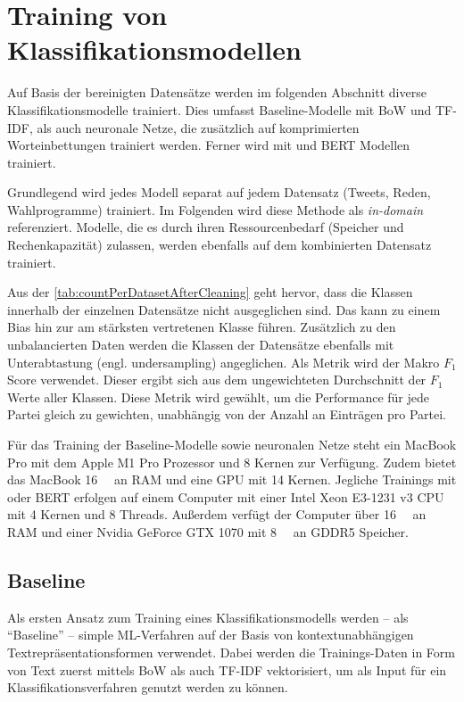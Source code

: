
\chapter{Training von Klassifikationsmodellen} \label{ch:crispDm_2}

Auf Basis der bereinigten Datensätze werden im folgenden Abschnitt diverse Klassifikationsmodelle trainiert. Dies umfasst Baseline-Modelle mit \ac{BoW} und \ac{TF-IDF}, als auch neuronale Netze, die zusätzlich auf komprimierten Worteinbettungen trainiert werden. Ferner wird mit \ft und \ac{BERT} Modellen trainiert.

Grundlegend wird jedes Modell separat auf jedem Datensatz (Tweets, Reden, Wahlprogramme) trainiert. Im Folgenden wird diese Methode als \textit{in-domain} referenziert. Modelle, die es durch ihren Ressourcenbedarf (Speicher und Rechenkapazität) zulassen, werden ebenfalls auf dem kombinierten Datensatz trainiert. 

Aus der \autoref{tab:countPerDatasetAfterCleaning} geht hervor, dass die Klassen innerhalb der einzelnen Datensätze nicht ausgeglichen sind. Das kann zu einem Bias hin zur am stärksten vertretenen Klasse führen. Zusätzlich zu den unbalancierten Daten werden die Klassen der Datensätze ebenfalls mit Unterabtastung (engl. undersampling) angeglichen. Als Metrik wird der Makro \(F_1\) Score verwendet. Dieser ergibt sich aus dem ungewichteten Durchschnitt der \(F_1\) Werte aller Klassen. Diese Metrik wird gewählt, um die Performance für jede Partei gleich zu gewichten, unabhängig von der Anzahl an Einträgen pro Partei.

Für das Training der Baseline-Modelle sowie neuronalen Netze steht ein MacBook Pro mit dem Apple M1 Pro Prozessor und \num{8} Kernen zur Verfügung. Zudem bietet das MacBook \SI{16}{\giga\byte} an \ac{RAM} und eine \ac{GPU} mit \num{14} Kernen. Jegliche Trainings mit \ft oder \ac{BERT} erfolgen auf einem Computer mit einer Intel Xeon E3-1231 v3 \ac{CPU} mit \num{4} Kernen und \num{8} Threads. Außerdem verfügt der Computer über \SI{16}{\giga\byte} an \ac{RAM} und einer Nvidia GeForce GTX 1070 mit \SI{8}{\giga\byte} an \ac{GDDR5} Speicher.

\section{Baseline} \label{sec:trainingBaseline}

Als ersten Ansatz zum Training eines Klassifikationsmodells werden -- als \enquote{Baseline} -- simple \ac{ML}-Verfahren auf der Basis von kontextunabhängigen Textrepräsentationsformen verwendet. Dabei werden die Trainings-Daten in Form von Text zuerst mittels \ac{BoW} als auch \ac{TF-IDF} vektorisiert, um als Input für ein Klassifikationsverfahren genutzt werden zu können.

